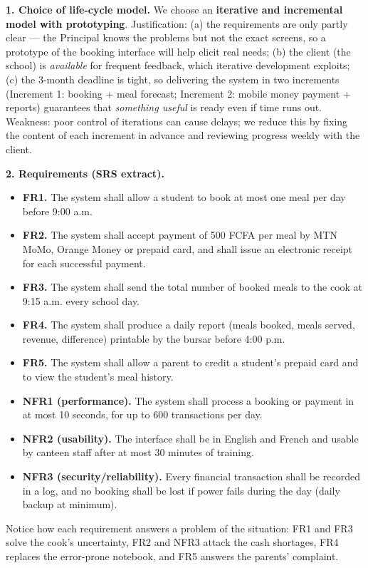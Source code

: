 \documentclass[11pt]{article}
\newcommand{\cle}[1]{{\popxbold\color{popdark}#1}}
\begin{document}
\textbf{1. Choice of life-cycle model.} We choose an \textbf{iterative and incremental model with prototyping}. Justification: (a) the requirements are only partly clear --- the Principal knows the problems but not the exact screens, so a \cle{prototype} of the booking interface will help elicit real needs; (b) the client (the school) is \emph{available} for frequent feedback, which iterative development exploits; (c) the 3-month deadline is tight, so delivering the system in two increments (Increment 1: booking + meal forecast; Increment 2: mobile money payment + reports) guarantees that \emph{something useful} is ready even if time runs out. Weakness: poor control of iterations can cause delays; we reduce this by fixing the content of each increment in advance and reviewing progress weekly with the client.

\textbf{2. Requirements (SRS extract).}

\begin{itemize}
\item \textbf{FR1.} The system shall allow a student to book at most one meal per day before 9:00 a.m.
\item \textbf{FR2.} The system shall accept payment of 500 FCFA per meal by MTN MoMo, Orange Money or prepaid card, and shall issue an electronic receipt for each successful payment.
\item \textbf{FR3.} The system shall send the total number of booked meals to the cook at 9:15 a.m. every school day.
\item \textbf{FR4.} The system shall produce a daily report (meals booked, meals served, revenue, difference) printable by the bursar before 4:00 p.m.
\item \textbf{FR5.} The system shall allow a parent to credit a student's prepaid card and to view the student's meal history.
\item \textbf{NFR1 (performance).} The system shall process a booking or payment in at most 10 seconds, for up to 600 transactions per day.
\item \textbf{NFR2 (usability).} The interface shall be in English and French and usable by canteen staff after at most 30 minutes of training.
\item \textbf{NFR3 (security/reliability).} Every financial transaction shall be recorded in a log, and no booking shall be lost if power fails during the day (daily backup at minimum).
\end{itemize}

Notice how each requirement answers a problem of the situation: FR1 and FR3 solve the cook's uncertainty, FR2 and NFR3 attack the cash shortages, FR4 replaces the error-prone notebook, and FR5 answers the parents' complaint.
\end{document}
